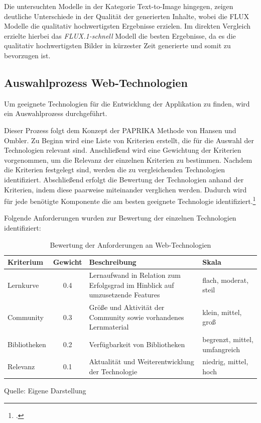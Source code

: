 Die untersuchten Modelle in der Kategorie Text-to-Image hingegen, zeigen deutliche Unterschiede in der Qualität der generierten Inhalte, wobei die FLUX Modelle die qualitativ hochwertigsten Ergebnisse erzielen.
Im direkten Vergleich erzielte hierbei das \textit{FLUX.1-schnell} Modell die besten Ergebnisse, da es die qualitativ hochwertigsten Bilder in kürzester Zeit generierte und somit zu bevorzugen ist.
\clearpage

\subsection{Auswahlprozess Web-Technologien}
Um geeignete Technologien für die Entwicklung der Applikation zu finden, wird ein Auswahlprozess durchgeführt.

Dieser Prozess folgt dem Konzept der \ac{PAPRIKA} Methode von Hansen und Ombler.
Zu Beginn wird eine Liste von Kriterien erstellt, die für die Auswahl der Technologien relevant sind.
Anschließend wird eine Gewichtung der Kriterien vorgenommen, um die Relevanz der einzelnen Kriterien zu bestimmen.
Nachdem die Kriterien festgelegt sind, werden die zu vergleichenden Technologien identifiziert.
Abschließend erfolgt die Bewertung der Technologien anhand der Kriterien, indem diese paarweise miteinander verglichen werden.
Dadurch wird für jede benötigte Komponente die am besten geeignete Technologie identifiziert.\footcite{Paprika2008}

Folgende Anforderungen wurden zur Bewertung der einzelnen Technologien identifiziert:

\begin{table}[htbp]
  \centering
  \begin{tabular}{|p{2cm}|c|p{5cm}|p{4cm}|}
      \hline
      \textbf{Kriterium} & \textbf{Gewicht} & \textbf{Beschreibung} & \textbf{Skala}\\ \hline
      {Lernkurve} & 0.4 & Lernaufwand in Relation zum Erfolgsgrad im Hinblick auf umzusetzende Features & flach, moderat, steil\\ \hline
      {Community} & 0.3 & Größe und Aktivität der Community sowie vorhandenes Lernmaterial & klein, mittel, groß\\ \hline
      {Bibliotheken} & 0.2 & Verfügbarkeit von Bibliotheken & begrenzt, mittel, umfangreich\\ \hline
      {Relevanz} & 0.1 & Aktualität und Weiterentwicklung der Technologie & niedrig, mittel, hoch\\ \hline
  \end{tabular}
  \caption{Bewertung der Anforderungen an Web-Technologien}\label{tab:table}
  \raggedright Quelle: Eigene Darstellung
\end{table}


